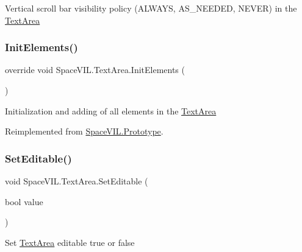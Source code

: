 Vertical scroll bar visibility policy (A\+L\+W\+A\+YS, A\+S\+\_\+\+N\+E\+E\+D\+ED, N\+E\+V\+ER) in the \mbox{\hyperlink{class_space_v_i_l_1_1_text_area}{Text\+Area}} 

\mbox{\label{class_space_v_i_l_1_1_text_area_a1d7971411658c81ed831c91958df7ade}} 
\subsubsection{\texorpdfstring{Init\+Elements()}{InitElements()}}
{\footnotesize\ttfamily override void Space\+V\+I\+L.\+Text\+Area.\+Init\+Elements (\begin{DoxyParamCaption}{ }\end{DoxyParamCaption})\hspace{0.3cm}{\ttfamily [virtual]}}



Initialization and adding of all elements in the \mbox{\hyperlink{class_space_v_i_l_1_1_text_area}{Text\+Area}} 



Reimplemented from \mbox{\hyperlink{class_space_v_i_l_1_1_prototype_ac3379fe02923ee155b5b0084abf27420}{Space\+V\+I\+L.\+Prototype}}.

\mbox{\label{class_space_v_i_l_1_1_text_area_aace48f2c2e10b98336dc0a06d85e3b9f}} 
\subsubsection{\texorpdfstring{Set\+Editable()}{SetEditable()}}
{\footnotesize\ttfamily void Space\+V\+I\+L.\+Text\+Area.\+Set\+Editable (\begin{DoxyParamCaption}\item[{bool}]{value }\end{DoxyParamCaption})}



Set \mbox{\hyperlink{class_space_v_i_l_1_1_text_area}{Text\+Area}} editable true or false 

